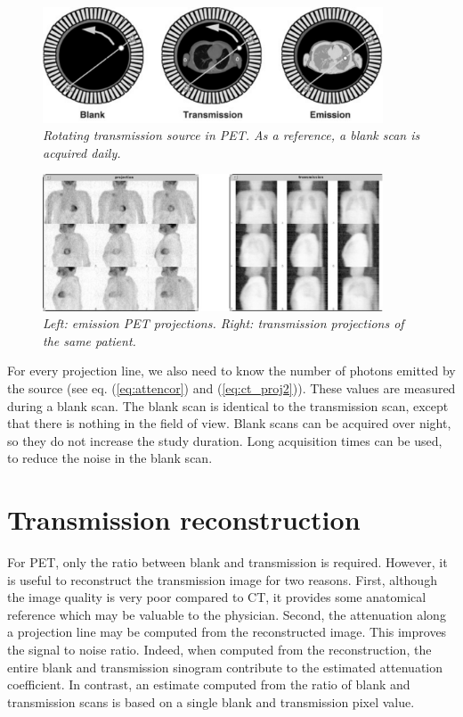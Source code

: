 \documentclass[11pt,oneside]{book}
\begin{document}
\begin{figure}[tb]
\centering
\includegraphics[width=0.9\textwidth]{figs/fig_pettrans.pdf}
\caption{\label{fig:pettrans} \emph{Rotating transmission source in PET. As a
reference, a blank scan is acquired daily.}}
\end{figure}

\begin{figure}[tb]
\centering
\includegraphics[width=0.9\textwidth]{figs/fig_transproj.pdf}
\caption{\label{fig:transproj} \emph{Left: emission PET projections. Right:
transmission projections of the same patient.}}
\end{figure}

For every projection line, we also need to know the number of photons
emitted by the source (see eq. (\ref{eq:attencor}) and
(\ref{eq:ct_proj2})). These values are measured during a blank
scan. The blank scan is identical to the transmission scan, except
that there is nothing in the field of view. Blank scans can be
acquired over night, so they do not increase the study duration. Long
acquisition times can be used, to reduce the noise in the blank scan.

\section{Transmission reconstruction}
For PET, only the ratio between blank and transmission is required. However,
it is useful to reconstruct the transmission image for two reasons. First,
although the image quality is very poor compared to CT, it provides some
anatomical reference which may be valuable to the physician. Second, the
attenuation along a projection line may be computed from the reconstructed
image. This improves the signal to noise ratio. Indeed, when computed from the
reconstruction, the entire blank and transmission sinogram contribute to the
estimated attenuation coefficient. In contrast, an estimate computed from the
ratio of blank and transmission scans is based on a single blank and
transmission pixel value.
\end{document}
